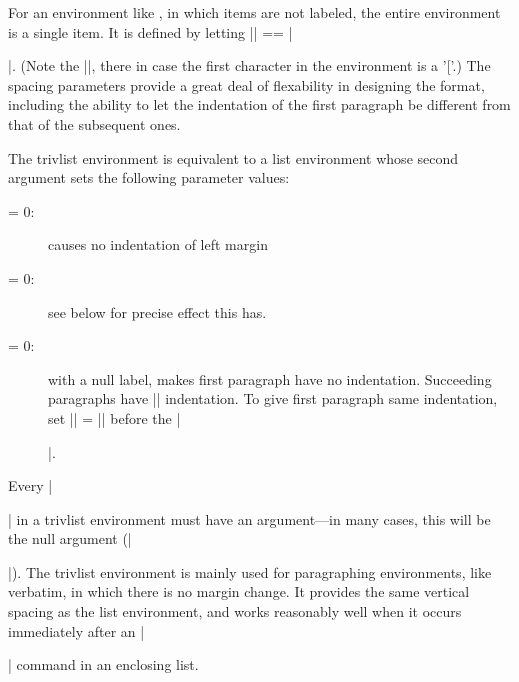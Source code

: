  For an environment like , in which items are not labeled,
 the entire environment is a single item.  It is defined by
 letting |\quotation| == |\item\relax|.  (Note the
 |\relax|, there in case the first character in the environment is a
 '['.)  The spacing parameters provide a great deal of flexability in
 designing the format, including the ability to let the indentation of
 the first paragraph be different from that of the subsequent ones.

 The trivlist environment is equivalent to a list environment
 whose second argument sets the following parameter values:
 \begin{description}
 \item[{} = 0:] causes no indentation of left margin
 \item[ = 0:] see below for precise effect this has.
 \item[ = 0:] with a null label, makes first paragraph
        have no indentation.  Succeeding paragraphs have |\parindent|
        indentation.  To give first paragraph same indentation, set
        |\itemindent| = |\parindent| before the |\item[]|.
 \end{description}

 Every |\item| in a trivlist environment must have an argument---in
 many cases, this will be the null argument (|\item[]|).  The trivlist
 environment is mainly used for paragraphing environments, like
 verbatim, in which there is no margin change.  It provides the same
 vertical spacing as the list environment, and works reasonably well
 when it occurs immediately after an |\item| command in an enclosing
 list.


